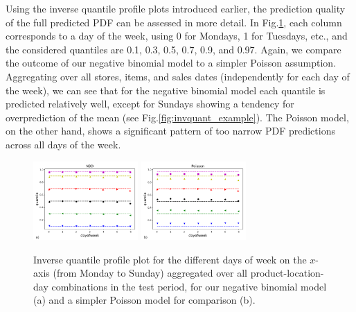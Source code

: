 \documentclass[BCOR=1mm, DIV=calc,10pt,
twoside=true,
twocolumn,
headings=normal]{scrartcl}
\newcommand{\fig}{Fig.}
\begin{document}
Using the inverse quantile profile plots introduced earlier, the prediction quality of the full predicted PDF can be assessed in more detail. In \fig \ref{fig:invquant_dayofweek}, each column corresponds to a day of the week, using 0 for Mondays, 1 for Tuesdays, etc., and the considered quantiles are 0.1, 0.3, 0.5, 0.7, 0.9, and 0.97. Again, we compare the outcome of our negative binomial model to a simpler Poisson assumption. Aggregating over all stores, items, and sales dates (independently for each day of the week), we can see that for the negative binomial model each quantile is predicted relatively well, except for Sundays showing a tendency for overprediction of the mean (see \fig \ref{fig:invquant_example}). The Poisson model, on the other hand, shows a significant pattern of too narrow PDF predictions across all days of the week.

\begin{figure}
\begin{center}
\includegraphics[width=4cm]{../figures/invquant_dayofweek_nbinom}
\includegraphics[width=4cm]{../figures/invquant_dayofweek_poisson}
\caption{\label{fig:invquant_dayofweek} Inverse quantile profile plot for the different days of week on the $x$-axis (from Monday to Sunday) aggregated over all product-location-day combinations in the test period, for our negative binomial model (a) and a simpler Poisson model for comparison (b).}
\end{center}
\end{figure}
\end{document}
